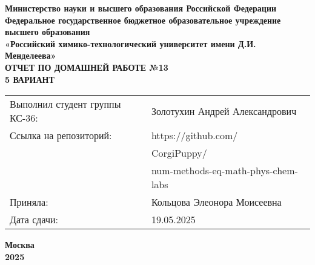 \documentclass[12pt, a4paper]{report}
\begin{document}
	\begin{titlepage}
		\begin{center}
			\large \textbf{Министерство науки и высшего образования Российской Федерации} \\
			\large \textbf{Федеральное государственное бюджетное образовательное учреждение высшего образования} \\
			\large \textbf{«Российский химико-технологический университет имени Д.И. Менделеева»} \\

			\vspace*{4cm}
			\LARGE \textbf{ОТЧЕТ ПО ДОМАШНЕЙ РАБОТЕ №13} \\
			\Large \textbf{5 ВАРИАНТ}

			\vspace*{3cm}
			\begin{flushright}
				\Large
				\begin{tabular}{>{\raggedleft\arraybackslash}p{9cm} p{10cm}}
					Выполнил студент группы КС-36: & Золотухин Андрей Александрович \\
					Ссылка на репозиторий: & https://github.com/ \\
					& CorgiPuppy/ \\
					& num-methods-eq-math-phys-chem-labs \\
					Приняла: & Кольцова Элеонора Моисеевна \\
					Дата сдачи: & 19.05.2025 \\
				\end{tabular}
			\end{flushright}

			\vspace*{6cm}
			\Large \textbf{Москва \\ 2025}
		\end{center}
	\end{titlepage}

	\tableofcontents
	\thispagestyle{empty}
	\newpage

\end{document}
